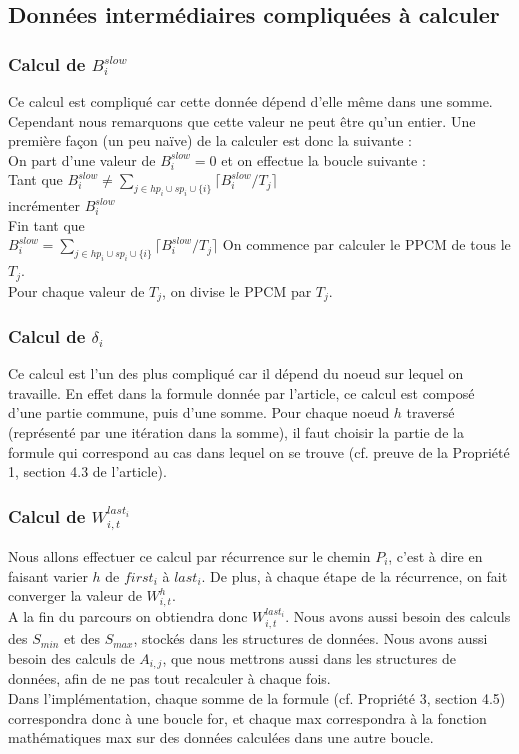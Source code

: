 \documentclass[10pt,a4paper]{article}
\begin{document}
\subsection{Données intermédiaires compliquées à calculer}

\subsubsection{Calcul de $B_i^{slow}$}
Ce calcul est compliqué car cette donnée dépend d'elle même dans une somme. Cependant 
nous remarquons que cette valeur ne peut être qu'un entier. Une première façon (un peu naïve) 
de la calculer est donc la suivante :\\
\linebreak
On part d'une valeur de $B_i^{slow} = 0$ et on effectue la boucle suivante :\\
Tant que $B_i^{slow} \neq \sum \limits _{j \in hp_i \cup sp_i \cup \{i\}} 
\lceil B_i^{slow}/T_ j\rceil$\\
\hspace{4em} incrémenter $B_i^{slow}$\\
Fin tant que\\
\linebreak
$B_i^{slow} = \sum \limits _{j \in hp_i \cup sp_i \cup \{i\}} 
\lceil B_i^{slow}/T_ j\rceil$
On commence par calculer le PPCM de tous le $T_j$.\\
Pour chaque valeur de $T_j$, on divise le PPCM par $T_j$.



\subsubsection{Calcul de $\delta_i$}
Ce calcul est l'un des plus compliqué car il dépend du noeud sur lequel on 
travaille. En effet dans la formule donnée par l'article, ce calcul est composé 
d'une partie commune, puis d'une somme. Pour chaque noeud $h$ traversé 
(représenté par une itération dans la somme), il faut choisir la partie de la 
formule qui correspond au cas dans lequel on se trouve (cf. preuve de la 
Propriété 1, section 4.3 de l'article).

\subsubsection{Calcul de $W_{i,t}^{last_i}$}

Nous allons effectuer ce calcul par récurrence sur le chemin $P_i$, c'est à 
dire en faisant varier $h$ de $first_i$ à $last_i$. De plus, à chaque étape de 
la récurrence, on fait converger la valeur de $W_{i,t}^h$.\\
A la fin du parcours on obtiendra donc $W_{i,t}^{last_i}$. 
Nous avons aussi besoin des calculs des ${S_{min}}$ et des 
$S_{max}$, stockés dans les
structures de données. Nous avons aussi besoin des calculs de $A_{i,j}$, que nous mettrons aussi 
dans les structures de données, afin de ne pas tout recalculer à chaque fois.\\
Dans l'implémentation, chaque somme de la formule (cf. Propriété 3, section 
4.5) correspondra donc à une boucle for, et chaque max correspondra à la 
fonction mathématiques max sur des données calculées dans une autre boucle.
\end{document}
